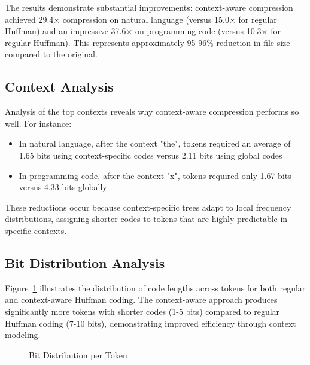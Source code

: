 \documentclass[conference]{IEEEtran}
\begin{document}
The results demonstrate substantial improvements: context-aware compression achieved 29.4× compression on natural language (versus 15.0× for regular Huffman) and an impressive 37.6× on programming code (versus 10.3× for regular Huffman). This represents approximately 95-96\% reduction in file size compared to the original.

\subsection{Context Analysis}
Analysis of the top contexts reveals why context-aware compression performs so well. For instance:

\begin{itemize}
\item In natural language, after the context "the", tokens required an average of 1.65 bits using context-specific codes versus 2.11 bits using global codes
\item In programming code, after the context "x", tokens required only 1.67 bits versus 4.33 bits globally
\end{itemize}

These reductions occur because context-specific trees adapt to local frequency distributions, assigning shorter codes to tokens that are highly predictable in specific contexts.

\subsection{Bit Distribution Analysis}
Figure~\ref{fig:bitdist} illustrates the distribution of code lengths across tokens for both regular and context-aware Huffman coding. The context-aware approach produces significantly more tokens with shorter codes (1-5 bits) compared to regular Huffman coding (7-10 bits), demonstrating improved efficiency through context modeling.

\begin{figure}[htbp]
\centering
{}
\caption{Bit Distribution per Token}
\label{fig:bitdist}
\end{figure}
\end{document}
